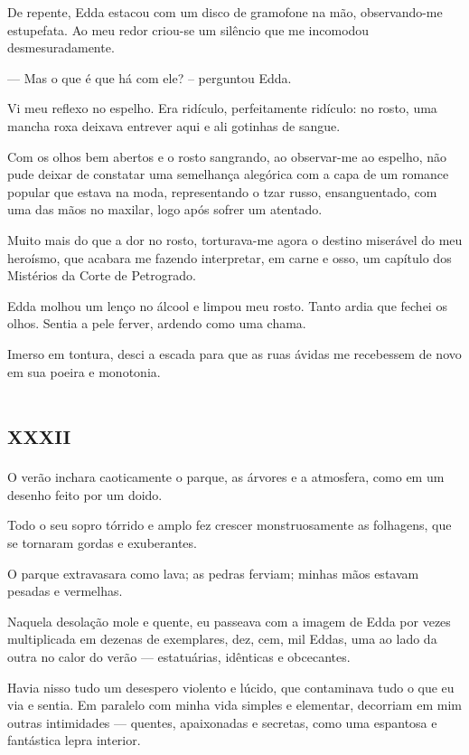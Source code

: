 De repente, Edda estacou com um disco de gramofone na mão, observando-me estupefata. Ao meu redor criou-se um silêncio que me incomodou desmesuradamente. 

--- Mas o que é que há com ele? -- perguntou Edda. 

Vi meu reflexo no espelho. Era ridículo, perfeitamente ridículo: no rosto, uma mancha roxa deixava entrever aqui e ali gotinhas de sangue.

Com os olhos bem abertos e o rosto sangrando, ao observar-me ao espelho, não pude deixar de constatar uma semelhança alegórica com a capa de um romance popular que estava na moda, representando o tzar russo, ensanguentado, com uma das mãos no maxilar, logo após sofrer um atentado.

Muito mais do que a dor no rosto, torturava-me agora o destino miserável do meu heroísmo, que acabara me fazendo interpretar, em carne e osso, um capítulo dos Mistérios da Corte de Petrogrado. 

Edda molhou um lenço no álcool e limpou meu rosto. Tanto ardia que fechei os olhos. Sentia a pele ferver, ardendo como uma chama.

Imerso em tontura, desci a escada para que as ruas ávidas me recebessem de novo em sua poeira e monotonia.


\chapter*{\huge\centering\textsc{xxxii}}

O verão inchara caoticamente o parque, as árvores e a atmosfera, como em um desenho feito por um doido.

Todo o seu sopro tórrido e amplo fez crescer monstruosamente as folhagens, que se tornaram gordas e exuberantes.

O parque extravasara como lava; as pedras ferviam; minhas mãos estavam pesadas e vermelhas.

Naquela desolação mole e quente, eu passeava com a imagem de Edda por vezes multiplicada em dezenas de exemplares, dez, cem, mil Eddas, uma ao lado da outra no calor do verão --- estatuárias, idênticas e obcecantes.

Havia nisso tudo um desespero violento e lúcido, que contaminava tudo o que eu via e sentia. Em paralelo com minha vida simples e elementar, decorriam em mim outras intimidades --- quentes, apaixonadas e secretas, como uma espantosa e fantástica lepra interior.

